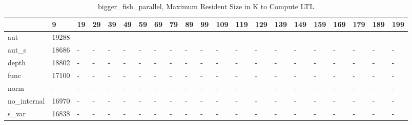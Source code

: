 \begin{table}
\caption{bigger_fish_parallel, Maximum Resident Size in K to Compute LTL}
\label{bigger_fish_parallel_LTL_size}
\begin{tabular}{lllllllllllllllllllll}
\toprule
 & 9 & 19 & 29 & 39 & 49 & 59 & 69 & 79 & 89 & 99 & 109 & 119 & 129 & 139 & 149 & 159 & 169 & 179 & 189 & 199 \\
\midrule
aut & 19288 & - & - & - & - & - & - & - & - & - & - & - & - & - & - & - & - & - & - & - \\
aut_s & 18686 & - & - & - & - & - & - & - & - & - & - & - & - & - & - & - & - & - & - & - \\
depth & 18802 & - & - & - & - & - & - & - & - & - & - & - & - & - & - & - & - & - & - & - \\
func & 17100 & - & - & - & - & - & - & - & - & - & - & - & - & - & - & - & - & - & - & - \\
norm & - & - & - & - & - & - & - & - & - & - & - & - & - & - & - & - & - & - & - & - \\
no_internal & 16970 & - & - & - & - & - & - & - & - & - & - & - & - & - & - & - & - & - & - & - \\
s_var & 16838 & - & - & - & - & - & - & - & - & - & - & - & - & - & - & - & - & - & - & - \\
\bottomrule
\end{tabular}
\end{table}
